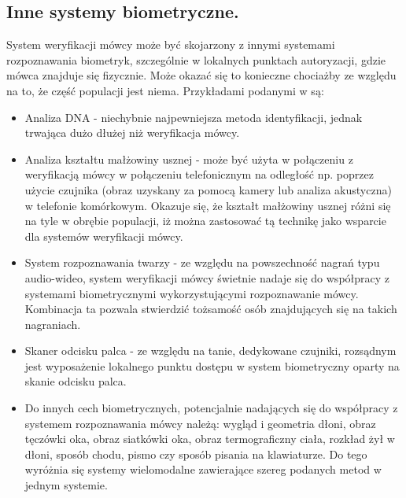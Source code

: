 \subsection{Inne systemy biometryczne.}
System weryfikacji mówcy może być skojarzony z innymi systemami rozpoznawania biometryk, szczególnie w lokalnych punktach autoryzacji, gdzie mówca znajduje się fizycznie. Może okazać się to konieczne chociażby ze względu na to, że część populacji jest niema. Przykładami podanymi w \cite{fosr} są:
\begin{itemize}
  \item Analiza DNA - niechybnie najpewniejsza metoda identyfikacji, jednak trwająca dużo dłużej niż weryfikacja mówcy. 
  \item Analiza kształtu małżowiny usznej - może być użyta w połączeniu z weryfikacją mówcy w połączeniu telefonicznym na odległość np. poprzez użycie czujnika (obraz uzyskany za pomocą kamery lub analiza akustyczna) w telefonie komórkowym. Okazuje się, że kształt małżowiny usznej różni się na tyle w obrębie populacji, iż można zastosować tą technikę jako wsparcie dla systemów weryfikacji mówcy. 
  \item System rozpoznawania twarzy - ze względu na powszechność nagrań typu audio-wideo, system weryfikacji mówcy świetnie nadaje się do współpracy z systemami biometrycznymi wykorzystującymi rozpoznawanie mówcy. Kombinacja ta pozwala stwierdzić tożsamość osób znajdujących się na takich nagraniach. 
  \item Skaner odcisku palca - ze względu na tanie, dedykowane czujniki, rozsądnym jest wyposażenie lokalnego punktu dostępu w system biometryczny oparty na skanie odcisku palca.
  \item Do innych cech biometrycznych, potencjalnie nadających się do współpracy z systemem rozpoznawania mówcy należą: wygląd i geometria dłoni, obraz tęczówki oka, obraz siatkówki oka, obraz termograficzny ciała, rozkład żył w dłoni, sposób chodu, pismo czy sposób pisania na klawiaturze. Do tego wyróżnia się systemy wielomodalne zawierające szereg podanych metod w jednym systemie.
  
\end{itemize}

